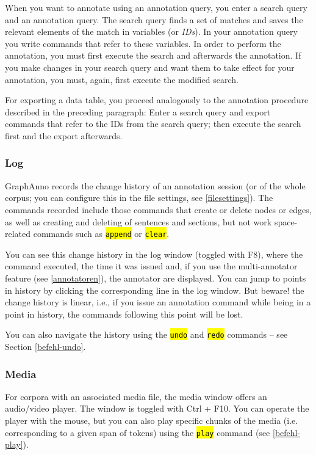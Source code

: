 \documentclass[12pt]{scrartcl}
\newcommand{\code}[1]{\hl{\texttt{#1}}}
\begin{document}
When you want to annotate using an annotation query, you enter a search query and an annotation query.
The search query finds a set of matches and saves the relevant elements of the match in variables (or \textit{IDs}).
In your annotation query you write commands that refer to these variables.
In order to perform the annotation, you must first execute the search and afterwards the annotation.
If you make changes in your search query and want them to take effect for your annotation, you must, again, first execute the modified search.

For exporting a data table, you proceed analogously to the annotation procedure described in the preceding paragraph:
Enter a search query and export commands that refer to the IDs from the search query; then execute the search first and the export afterwards.

\subsubsection{Log}\label{window-log}

GraphAnno records the change history of an annotation session (or of the whole corpus; you can configure this in the file settings, see \ref{filesettings}).
The commands recorded include those commands that create or delete nodes or edges, as well as creating and deleting of sentences and sections, but not work space-related commands such as \code{append} or \code{clear}.

You can see this change history in the log window (toggled with F8), where the command executed, the time it was issued and, if you use the multi-annotator feature (see \ref{annotatoren}), the annotator are displayed.
You can jump to points in history by clicking the corresponding line in the log window.
But beware! the change history is linear, i.e., if you issue an annotation command while being in a point in history, the commands following this point will be lost.

You can also navigate the history using the \code{undo} and \code{redo} commands – see Section \ref{befehl-undo}.

\subsubsection{Media}\label{window-media}

For corpora with an associated media file, the media window offers an audio/video player.
The window is toggled with Ctrl + F10.
You can operate the player with the mouse, but you can also play specific chunks of the media (i.e. corresponding to a given span of tokens) using the \code{play} command (see \ref{befehl-play}).
\end{document}
